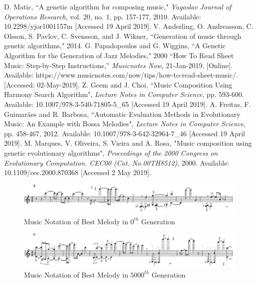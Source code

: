 \documentclass[conference]{IEEEtran}
\begin{document}
\begin{thebibliography}{00}
 D. Matic, ``A genetic algorithm for composing music," \textit{Yugoslav Journal of Operations Research}, vol. 20, no. 1, pp. 157-177, 2010. Available: 10.2298/yjor1001157m [Accessed 19 April 2019].
V. Anderling, O. Andreasson, C. Olsson, S. Pavlov, C. Svensson, and J. Wikner, ``Generation of music through genetic algorithms," 2014.
G. Papadopoulos and G. Wiggins, ``A Genetic Algorithm for the Generation of Jazz Melodies," 2000
“How To Read Sheet Music: Step-by-Step Instructions,” \textit{Musicnotes Now}, 21-Jan-2019. [Online]. Available: https://www.musicnotes.com/now/tips/how-to-read-sheet-music/. [Accessed: 02-May-2019].
 Z. Geem and J. Choi, ``Music Composition Using Harmony Search Algorithm", \textit{Lecture Notes in Computer Science}, pp. 593-600. Available: 10.1007/978-3-540-71805-5\_65 [Accessed 19 April 2019].
 A. Freitas, F. Guimarães and R. Barbosa, ``Automatic Evaluation Methods in Evolutionary Music: An Example with Bossa Melodies", \textit{Lecture Notes in Computer Science}, pp. 458-467, 2012. Available: 10.1007/978-3-642-32964-7\_46 [Accessed 19 April 2019].
M. Marques, V. Oliveira, S. Vieira and A. Rosa, "Music composition using genetic evolutionary algorithms", \textit{Proceedings of the 2000 Congress on Evolutionary Computation. CEC00 (Cat. No.00TH8512)}, 2000. Available: 10.1109/cec.2000.870368 [Accessed 2 May 2019].
\end{thebibliography}

\begin{figure}
\includegraphics[width=20 cm]{gen-0.png}
\caption{Music Notation of Best Melody in $0^{th}$ Generation}
\label{gen-0}
\end{figure}

\begin{figure}
\includegraphics[width=20 cm]{final.png}
\caption{Music Notation of Best Melody in $5000^{th}$ Generation}
\label{final}
\end{figure}
\end{document}
